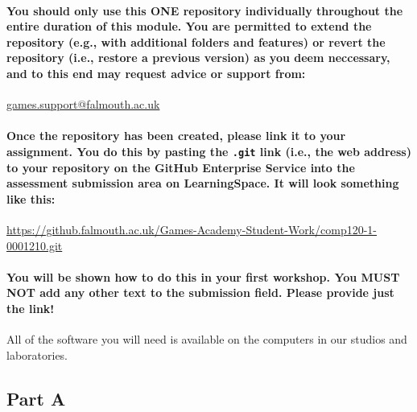 \documentclass{../../fal_assignment}
\begin{document}

\paragraph{You should only use this \textbf{ONE} repository individually throughout the entire duration of this module. You are permitted to extend the repository (e.g., with additional folders and features) or revert the repository (i.e., restore a previous version) as you deem neccessary, and to this end may request advice or support from:}

\url{games.support@falmouth.ac.uk}

\paragraph{Once the repository has been created, please link it to your assignment. You do this by pasting the \texttt{.git} link (i.e., the web address) to your repository on the GitHub Enterprise Service into the assessment submission area on LearningSpace. It will look something like this:}

{\small\url{https://github.falmouth.ac.uk/Games-Academy-Student-Work/comp120-1-0001210.git}}

\vspace{-1em}\paragraph{You will be shown how to do this in your first workshop. You \textbf{MUST NOT} add any other text to the submission field. Please provide just the link!}


All of the software you will need is available on the computers in our studios and laboratories.

\subsection*{Part A}
\end{document}
